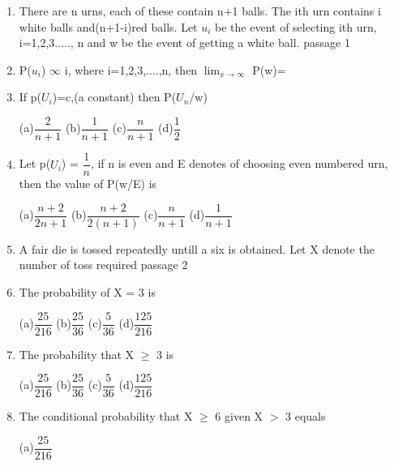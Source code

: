 \documentclass[journal,12pt,twocolumn]{IEEEtran}
\begin{document}
\begin{enumerate}[label=\arabic*]
	\item  There are n urns, each of these contain n+1 balls. The ith urn contains i white balls and(n+1-i)red balls. Let $u_i$ be the event of selecting ith urn, i=1,2,3....., n and w be the event of getting a white ball.   passage 1\\
	\item P($u_i$) $\infty$ i, where i=1,2,3,....,n, then $\displaystyle{\lim_{x \to \infty}}$ P(w)= 	
	\begin{itemize}
	\begin{multicols}{4}
	\item[(a)]1   \item[(b)]$\dfrac{2}{3}$  \item[(c)]$\dfrac{3}{4}$  \item[(d)]$\dfrac{1}{4}$
	\end{multicols}
	\end{itemize}
	\item  If p($U_i$)=c,(a  constant) then P($U_n$/w)
	\begin{multicols}{4}
	(a)$\dfrac{2}{n+1}$  (b)$\dfrac{1}{n+1}$  (c)$\dfrac{n}{n+1}$  (d)$\dfrac{1}{2}$
	\end{multicols}
	\item Let p($U_i$) = $\dfrac{1}{n}$, if n is even and E denotes of choosing even numbered urn, then the value of P(w/E) is\\
	\begin{multicols}{2}
	(a)$\dfrac{n+2}{2n+1}$    
	(b)$\dfrac{n+2}{2(n+1)}$ 
	(c)$\dfrac{n}{n+1}$
	(d)$\dfrac{1}{n+1}$
	\end{multicols}
	\item A fair die is tossed repeatedly untill a six is obtained. Let X denote the number of toss required    passage 2\\
	\item The probability of X = 3 is
	\begin{multicols}{4}
	(a)$\dfrac{25}{216}$ 
	(b)$\dfrac{25}{36}$	
	(c)$\dfrac{5}{36}$
	(d)$\dfrac{125}{216}$
	\end{multicols}
	\item The probability that X $\geq$ 3 is
	\begin{multicols}{4}
	(a)$\dfrac{25}{216}$ 
	(b)$\dfrac{25}{36}$	
	(c)$\dfrac{5}{36}$
	(d)$\dfrac{125}{216}$
	\end{multicols}
	\item The conditional probability that X $\geq$ 6 given X $>$ 3 equals
	\begin{multicols}{4}
	(a)$\dfrac{25}{216}$ 

\end{multicols}
\end{enumerate}
\end{document}
